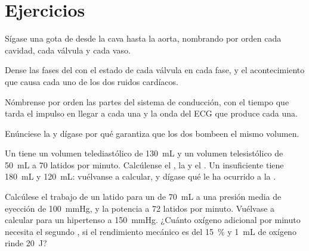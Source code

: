 \section{Ejercicios}

\begin{exercise}[$\star$]\label{exo:b2:heart:1}
Sígase una gota de  desde la  cava hasta la aorta, nombrando por
orden cada cavidad, cada válvula y cada vaso.
\end{exercise}

\begin{exercise}[$\star$]\label{exo:b2:heart:2}
Dense las fases del  con el estado de cada válvula en cada
fase, y el acontecimiento que causa cada uno de los dos ruidos cardíacos.
\end{exercise}

\begin{exercise}[$\star$]\label{exo:b2:heart:3}
Nómbrense por orden las partes del sistema de conducción, con el tiempo que
tarda el impulso en llegar a cada una y la onda del ECG que produce cada
una.
\end{exercise}

\begin{exercise}[$\star$]\label{exo:b2:heart:4}
Enúnciese la  y dígase por qué garantiza que los dos
 bombeen el mismo volumen.
\end{exercise}

\begin{exercise}[$\star\star$]\label{exo:b2:heart:5}
Un  tiene un volumen telediastólico de \qty{130}{mL} y un volumen
telesistólico de \qty{50}{mL} a 70 latidos por minuto. Calcúlense el
, la  y el . Un 
insuficiente tiene \qty{180}{mL} y \qty{120}{mL}: vuélvanse a calcular, y
dígase qué le ha ocurrido a la .
\end{exercise}

\begin{exercise}[$\star\star$]\label{exo:b2:heart:6}
Calcúlese el trabajo de un latido para un  de
\qty{70}{mL} a una presión media de eyección de \qty{100}{mmHg}, y la
potencia a 72 latidos por minuto. Vuélvase a calcular para un hipertenso a
\qty{150}{mmHg}. ¿Cuánto oxígeno adicional por minuto necesita el segundo
, si el rendimiento mecánico es del \qty{15}{\%} y \qty{1}{mL} de
oxígeno rinde \qty{20}{J}?
\end{exercise}

